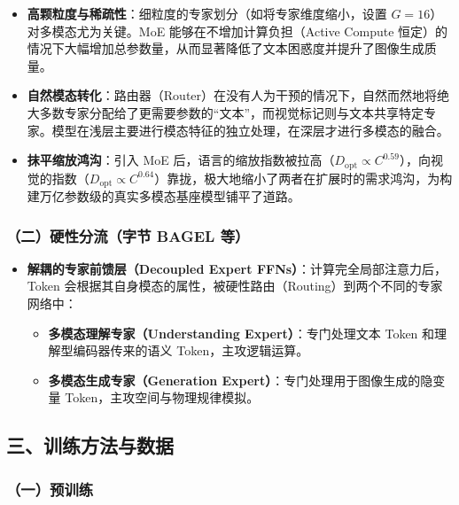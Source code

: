 \begin{itemize}
\tightlist
\item
  \textbf{高颗粒度与稀疏性}：细粒度的专家划分（如将专家维度缩小，设置 \(G=16\)）对多模态尤为关键。MoE 能够在不增加计算负担（Active Compute 恒定）的情况下大幅增加总参数量，从而显著降低了文本困惑度并提升了图像生成质量。
\item
  \textbf{自然模态转化}：路由器（Router）在没有人为干预的情况下，自然而然地将绝大多数专家分配给了更需要参数的``文本''，而视觉标记则与文本共享特定专家。模型在浅层主要进行模态特征的独立处理，在深层才进行多模态的融合。
\item
  \textbf{抹平缩放鸿沟}：引入 MoE 后，语言的缩放指数被拉高（\(D_{\mathrm{opt}}\propto C^{0.59}\)），向视觉的指数（\(D_{\mathrm{opt}}\propto C^{0.64}\)）靠拢，极大地缩小了两者在扩展时的需求鸿沟，为构建万亿参数级的真实多模态基座模型铺平了道路。
\end{itemize}

\hypertarget{ux4e8cux786cux6027ux5206ux6d41ux5b57ux8282-bagel-ux7b49}{%
\subsubsection{（二）硬性分流（字节 BAGEL 等）}\label{ux4e8cux786cux6027ux5206ux6d41ux5b57ux8282-bagel-ux7b49}}

\begin{itemize}
\tightlist
\item
  \textbf{解耦的专家前馈层（Decoupled Expert FFNs）}：计算完全局部注意力后，Token 会根据其自身模态的属性，被硬性路由（Routing）到两个不同的专家网络中：

  \begin{itemize}
  \tightlist
  \item
    \textbf{多模态理解专家（Understanding Expert）}：专门处理文本 Token 和理解型编码器传来的语义 Token，主攻逻辑运算。
  \item
    \textbf{多模态生成专家（Generation Expert）}：专门处理用于图像生成的隐变量 Token，主攻空间与物理规律模拟。
  \end{itemize}
\end{itemize}

\hypertarget{ux4e09ux8badux7ec3ux65b9ux6cd5ux4e0eux6570ux636e}{%
\subsection{三、训练方法与数据}\label{ux4e09ux8badux7ec3ux65b9ux6cd5ux4e0eux6570ux636e}}

\hypertarget{ux4e00ux9884ux8badux7ec3-1}{%
\subsubsection{（一）预训练}\label{ux4e00ux9884ux8badux7ec3-1}}

